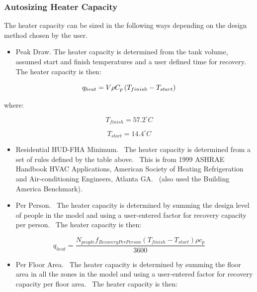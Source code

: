 \subsubsection{Autosizing Heater Capacity}\label{autosizing-heater-capacity}

The heater capacity can be sized in the following ways depending on the design method chosen by the user.

\begin{itemize}
  \item Peak Draw. The heater capacity is determined from the tank volume, assumed start and finish temperatures and a user defined time for recovery.~ The heater capacity is then:
\end{itemize}

\begin{equation}
  q_{heat} = V\rho C_p \left(T_{finish} - T_{start}\right)
\end{equation}

where:

\begin{equation}
{T_{finish}} = 57.2^{\circ}C
\end{equation}

\begin{equation}
{T_{start}} = 14.4^{\circ}C
\end{equation}

\begin{itemize}
\item Residential HUD-FHA Minimum.~ The heater capacity is determined from a set of rules defined by the table above.~ This is from 1999 ASHRAE Handbook HVAC Applications, American Society of Heating Refrigeration and Air-conditioning Engineers, Atlanta GA.~ (also used the Building America Benchmark).
\item Per Person.~ The heater capacity is determined by summing the design level of people in the model and using a user-entered factor for recovery capacity per person.~ The heater capacity is then:
\end{itemize}

\begin{equation}
{q_{heat}} = \frac{{{N_{people}}{f_{RecoveryPerPerson}}({T_{finish}} - {T_{start}}) \rho {c_p}}}{{3600}}
\end{equation}

\begin{itemize}
\item Per Floor Area.~ The heater capacity is determined by summing the floor area in all the zones in the model and using a user-entered factor for recovery capacity per floor area.~ The heater capacity is then:
\end{itemize}


